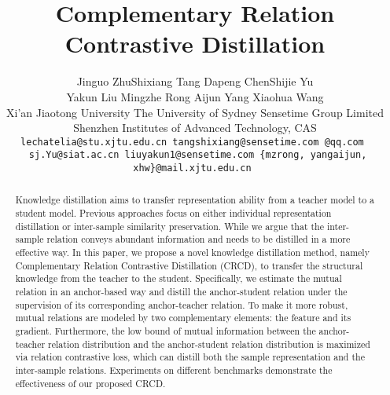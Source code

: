 \documentclass[final]{cvpr}
\begin{document}
\pagestyle{empty}  




\title{Complementary Relation Contrastive Distillation}
\renewcommand{\thefootnote}{\fnsymbol{footnote}}
\author{Jinguo Zhu\footnotemark[2] \qquad Shixiang Tang \qquad Dapeng Chen\footnotemark[3]  \qquad Shijie Yu \\
Yakun Liu   \qquad Mingzhe Rong  \qquad Aijun Yang   \qquad Xiaohua Wang\footnotemark[3] \\
Xi'an Jiaotong University  \qquad The University of Sydney \qquad  Sensetime Group Limited \\  
Shenzhen Institutes of Advanced Technology, CAS\\
{\tt\small lechatelia@stu.xjtu.edu.cn \quad  tangshixiang@sensetime.com @qq.com }
\\ 
{\tt\small
 sj.Yu@siat.ac.cn \quad liuyakun1@sensetime.com \quad \{mzrong, yangaijun, xhw\}@mail.xjtu.edu.cn
}
}



\maketitle
\thispagestyle{empty} 


\begin{abstract}
Knowledge distillation aims to transfer representation ability from a teacher model to a student model.  Previous approaches focus on either individual representation distillation or inter-sample similarity preservation. While  we argue that the inter-sample relation conveys abundant information  and needs to be distilled in a more effective way.  
In this paper, we propose a novel knowledge distillation method, namely Complementary Relation Contrastive Distillation (CRCD), to transfer the structural knowledge from the teacher to the student. Specifically,  we estimate the mutual relation in an anchor-based way and distill the anchor-student relation under the supervision of its corresponding anchor-teacher relation. To make it more robust, mutual relations are modeled by two complementary elements: the feature and its gradient. Furthermore, the low bound of mutual information between the anchor-teacher relation distribution  and the anchor-student relation distribution is maximized via relation contrastive loss, which can distill both the sample representation and the inter-sample relations. Experiments on different benchmarks demonstrate the effectiveness of our proposed CRCD.









\end{abstract}
\end{document}
